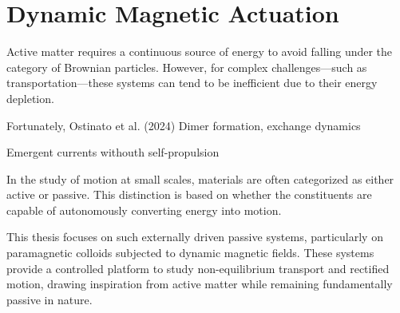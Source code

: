 \section{Dynamic Magnetic Actuation}

Active matter requires a continuous source of energy to avoid falling under the category of Brownian particles. However, for complex challenges—such as transportation—these systems can tend to be inefficient due to their energy depletion.

Fortunately, Ostinato et al. (2024)
Dimer formation, exchange dynamics

Emergent currents withouth self-propulsion

In the study of motion at small scales, materials are often categorized as either active or passive. This distinction is based on whether the constituents are capable of autonomously converting energy into motion.


This thesis focuses on such externally driven passive systems, particularly on paramagnetic colloids subjected to dynamic magnetic fields. These systems provide a controlled platform to study non-equilibrium transport and rectified motion, drawing inspiration from active matter while remaining fundamentally passive in nature.

\newpage
